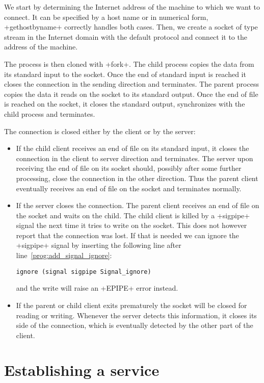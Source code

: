 We start by determining the Internet address of the machine to which
we want to connect. It can be specified by a host name or in numerical
form, \ml+gethostbyname+ correctly handles both cases. Then, we create
a socket of type stream in the Internet domain with the default protocol
and connect it to the address of the machine.

The process is then cloned with \ml+fork+. The child process copies
the data from its standard input to the socket. Once the end of
standard input is reached it closes the connection in the sending
direction and terminates. The parent process copies the data it reads
on the socket to its standard output. Once the end of file is reached
on the socket, it closes the standard output, synchronizes with the
child process and terminates.

The connection is closed either by the client or by the server:
\begin{itemize}
\item If the child client receives an end of file on its standard
  input, it closes the connection in the client to server direction
  and terminates. The server upon receiving the end of file on its
  socket should, possibly after some further processing, close the
  connection in the other direction. Thus the parent client eventually
  receives an end of file on the socket and terminates normally.
%
\item If the server closes the connection. The parent client receives
  an end of file on the socket and waits on the child. The
  child client is killed by a \ml+sigpipe+ signal the next time it
  tries to write on the socket. This does not however report that the
  connection was lost. If that is needed we can ignore
  the \ml+sigpipe+ signal by inserting the following line after
  line~\ref{prog:add_signal_ignore}:
\begin{lstlisting}
ignore (signal sigpipe Signal_ignore)
\end{lstlisting}

\noindent and the write will raise an \ml+EPIPE+ error instead.
%
\item If the parent or child client exits prematurely the socket will
  be closed for reading or writing. 
  Whenever the server detects this information, it closes its
  side of the connection, which is eventually detected by the other part of the
  client. 
\end{itemize}


\section{\label{sec/service}Establishing a service}

